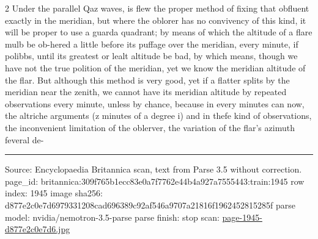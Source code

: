 \documentclass[10pt]{article}
\begin{document}
\begin{multicols}{2}
Under the parallel Qaz waves, is flew the proper method of fixing that obfluent exactly in the meridian, but where the oblorer has no convivency of this kind, it will be proper to use a guarda quadrant; by means of which the altitude of a flare mulb be ob-hered a little before its puffage over the meridian, every minute, if polibbs, until its greatest or lealt altitude be bad, by which means, though we have not the true polition of the meridian, yet we know the meridian altitude of the flar. But although this method is very good, yet if a flatter splits by the meridian near the zenith, we cannot have its meridian altitude by repeated observations every minute, unless by chance, because in every minutes can now, the altriche arguments (z minutes of a degree i) and in thefe kind of observations, the inconvenient limitation of the oblerver, the variation of the flar's azimuth feveral de-

\end{multicols}
\vfill\par\noindent\rule{\linewidth}{0.4pt}\par
{\scriptsize\color{gray}\noindent Source: Encyclopaedia Britannica scan, text from Parse 3.5 without correction. page\_id: britannica:309f765b1ecc83e0a7f7762e44b4a927a7555443:train:1945 \quad row index: 1945 \quad image sha256: d877e2c0e7d6979331208cad696389c92af546a9707a21816f1962452815285f \quad parse model: nvidia/nemotron-3.5-parse \quad parse finish: stop \quad scan: \href{../scans/page-1945-d877e2c0e7d6.jpg}{page-1945-d877e2c0e7d6.jpg}\par}
\end{document}
